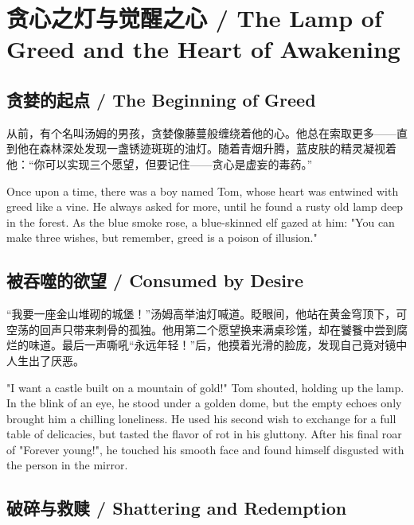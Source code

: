 \chapter*{贪心之灯与觉醒之心 / The Lamp of Greed and the Heart of Awakening}

\section*{贪婪的起点 / The Beginning of Greed}

从前，有个名叫汤姆的男孩，贪婪像藤蔓般缠绕着他的心。他总在索取更多——直到他在森林深处发现一盏锈迹斑斑的油灯。随着青烟升腾，蓝皮肤的精灵凝视着他：“你可以实现三个愿望，但要记住——贪心是虚妄的毒药。”

\begin{flushright}
Once upon a time, there was a boy named Tom, whose heart was entwined with greed like a vine. He always asked for more, until he found a rusty old lamp deep in the forest. As the blue smoke rose, a blue-skinned elf gazed at him: "You can make three wishes, but remember, greed is a poison of illusion."
\end{flushright}

\section*{被吞噬的欲望 / Consumed by Desire}

“我要一座金山堆砌的城堡！”汤姆高举油灯喊道。眨眼间，他站在黄金穹顶下，可空荡的回声只带来刺骨的孤独。他用第二个愿望换来满桌珍馐，却在饕餮中尝到腐烂的味道。最后一声嘶吼“永远年轻！”后，他摸着光滑的脸庞，发现自己竟对镜中人生出了厌恶。

\begin{flushright}
"I want a castle built on a mountain of gold!" Tom shouted, holding up the lamp. In the blink of an eye, he stood under a golden dome, but the empty echoes only brought him a chilling loneliness. He used his second wish to exchange for a full table of delicacies, but tasted the flavor of rot in his gluttony. After his final roar of "Forever young!", he touched his smooth face and found himself disgusted with the person in the mirror.
\end{flushright}

\section*{破碎与救赎 / Shattering and Redemption}

